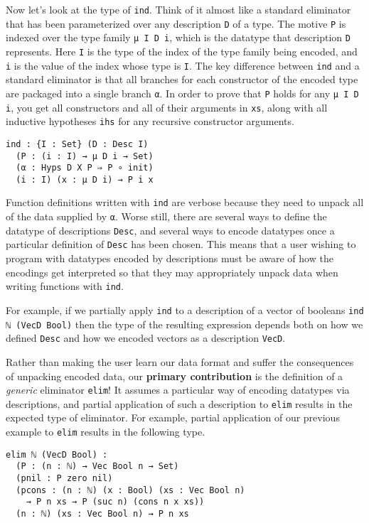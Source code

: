 \documentclass[preprint,nonatbib]{sigplanconf}
\begin{document}
Now let's look at the type of {\tt ind}. Think of it almost like a standard
eliminator that has been parameterized over any description {\tt D} of a type. The
motive {\tt P} is indexed over the type family {\tt μ I D i}, which is
the datatype that description {\tt D} represents.
Here {\tt I} is the type of the index of the type family being
encoded, and {\tt i} is the value of the index whose type is {\tt I}.
The key difference
between {\tt ind} and a standard eliminator is that all branches for
each constructor of the encoded type are packaged into a single branch
{\tt α}. In order to prove that {\tt P} holds for any
{\tt μ I D i}, you get all constructors and all of their
arguments in {\tt xs}, along with all inductive
hypotheses {\tt ihs} for any recursive constructor arguments.

\newpage

\begin{verbatim}
ind : {I : Set} (D : Desc I)
  (P : (i : I) → μ D i → Set)
  (α : Hyps D X P ⇒ P ∘ init)
  (i : I) (x : μ D i) → P i x
\end{verbatim}

Function definitions written with {\tt ind} are verbose
because they need to unpack all of the data supplied by {\tt α}.
Worse still, there are several ways to define the datatype of
descriptions {\tt Desc}, and several ways to encode datatypes once a
particular definition of {\tt Desc} has been chosen. This means that a
user wishing to program with datatypes encoded by descriptions must be
aware of how the encodings get interpreted so that they may
appropriately unpack data when writing functions with {\tt ind}.

For example, if we partially apply {\tt ind} to a description of a
vector of booleans {\tt ind ℕ (VecD Bool)} then the type of the
resulting expression depends both on how we defined {\tt Desc} and how
we encoded vectors as a description {\tt VecD}.

Rather than making the user learn our data format and suffer the
consequences of unpacking encoded data, our {\bf primary contribution} is
the definition of a {\it generic} eliminator {\tt elim}!
It assumes a particular way of encoding
datatypes via descriptions, and partial application of such a
description to {\tt elim} results in the expected type of eliminator.
For example, partial application of our previous example to
{\tt elim} results in the following type.

\begin{verbatim}
elim ℕ (VecD Bool) :
  (P : (n : ℕ) → Vec Bool n → Set)
  (pnil : P zero nil)
  (pcons : (n : ℕ) (x : Bool) (xs : Vec Bool n)
    → P n xs → P (suc n) (cons n x xs))
  (n : ℕ) (xs : Vec Bool n) → P n xs
\end{verbatim}
\end{document}
